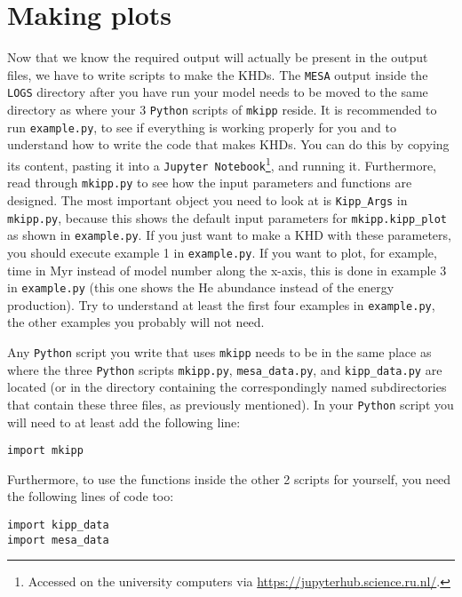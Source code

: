 \documentclass[11pt,a4paper]{article}
\begin{document}
\section{Making plots}
Now that we know the required output will actually be present in the output files, we have to write scripts to make the KHDs. The \texttt{MESA} output inside the \texttt{LOGS} directory after you have run your model needs to be moved to the same directory as where your 3 \texttt{Python} scripts of \texttt{mkipp} reside. It is recommended to run \texttt{example.py}, to see if everything is working properly for you and to understand how to write the code that makes KHDs. You can do this by copying its content, pasting it into a \texttt{Jupyter Notebook}\footnote{Accessed on the university computers via \url{https://jupyterhub.science.ru.nl/}.}, and running it. Furthermore, read through \texttt{mkipp.py} to see how the input parameters and functions are designed. The most important object you need to look at is \texttt{Kipp\_Args} in \texttt{mkipp.py}, because this shows the default input parameters for \texttt{mkipp.kipp\_plot} as shown in \texttt{example.py}. If you just want to make a KHD with these parameters, you should execute example 1 in \texttt{example.py}. If you want to plot, for example, time in Myr instead of model number along the x-axis, this is done in example 3 in \texttt{example.py} (this one shows the He abundance instead of the energy production). Try to understand at least the first four examples in \texttt{example.py}, the other examples you probably will not need. 

\bigskip\noindent
Any \texttt{Python} script you write that uses \texttt{mkipp} needs to be in the same place as where the three \texttt{Python} scripts \texttt{mkipp.py}, \texttt{mesa\_data.py}, and \texttt{kipp\_data.py} are located (or in the directory containing the correspondingly named subdirectories that contain these three files, as previously mentioned). In your \texttt{Python} script you will need to at least add the following line: 
\begin{verbatim}
import mkipp
\end{verbatim}
Furthermore, to use the functions inside the other 2 scripts for yourself, you need the following lines of code too:
\begin{verbatim}
import kipp_data
import mesa_data
\end{verbatim}
\end{document}
